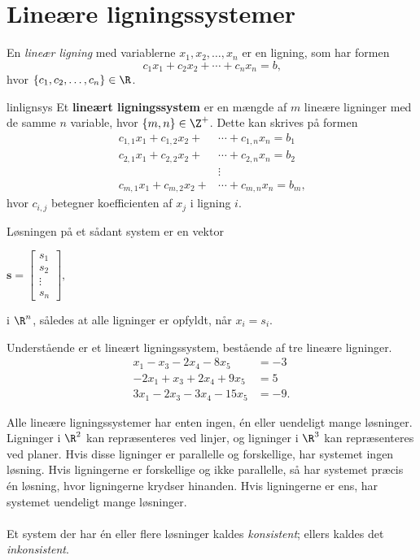 \section{Lineære ligningssystemer }
%
En \textit{lineær ligning} med variablerne $x_1,x_2,\ldots ,x_n$ er en ligning, som har formen
$$ c_1x_1+c_2x_2+\cdots+c_nx_n=b \text{,}$$ 
hvor $\{c_1,c_2,\ldots,c_n\} \in \R$. 
%
\begin{defn}{}{linlignsys}
Et \textbf{lineært ligningssystem} er en mængde af $m$ lineære ligninger med de samme $n$ variable, hvor $\{m, n\} \in \Z^+$.
Dette kan skrives på formen
\begin{align*}
c_{1,1}x_1+c_{1,2}x_2+&\cdots+c_{1,n}x_n=b_1\\
c_{2,1}x_1+c_{2,2}x_2+&\cdots+c_{2,n}x_n=b_2\\
&\vdots\\
c_{m,1}x_1+c_{m,2}x_2+&\cdots +c_{m,n}x_n=b_m
\text{,}
\end{align*}
hvor $c_{i,j}$ betegner koefficienten af $x_j$ i ligning $i$.
\end{defn}
\noindent
Løsningen på et sådant system er en vektor
\begin{center}
$
\mathbf{s} = 
\begin{bmatrix}
s_1\\
s_2\\
\vdots\\
s_n
\end{bmatrix},
$
\end{center}
i $\R ^n$, således at alle ligninger er opfyldt, når $x_i = s_i$.
%
\\
%
\begin{eks}
\label{eks:lignsys}
Understående er et lineært ligningssystem, bestående af tre lineære ligninger.
%
\begin{align*}
x_1-x_3-2x_4-8x_5&=-3 \\
-2x_1+x_3+2x_4+9x_5&=5 \\
3x_1-2x_3-3x_4-15x_5&=-9.
\end{align*}
%
%
%
\end{eks}
%
Alle lineære ligningssystemer har enten ingen, én eller uendeligt mange løsninger.
Ligninger i $\R^2$ kan repræsenteres ved linjer, og ligninger i $\R^3$ kan repræsenteres ved planer.
Hvis disse ligninger er parallelle og forskellige, har systemet ingen løsning.
Hvis ligningerne er forskellige og ikke parallelle, så har systemet præcis én løsning, hvor ligningerne krydser hinanden.
Hvis ligningerne er ens, har systemet uendeligt mange løsninger.
\\\\
%
Et system der har én eller flere løsninger kaldes \textit{konsistent}; ellers kaldes det \textit{inkonsistent}.
%
%
